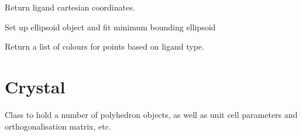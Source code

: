 \documentclass[a4paper,10pt,openany, oneside]{sphinxmanual}
\begin{document}
\begin{fulllineitems}
\begin{fulllineitems}
\label{api_reference:distellipsoid.polyhedron.Polyhedron.ligxyz}
Return ligand cartesian coordinates.

\end{fulllineitems}


\begin{fulllineitems}
\label{api_reference:distellipsoid.polyhedron.Polyhedron.makeellipsoid}
Set up ellipsoid object and fit minimum bounding ellipsoid

\end{fulllineitems}


\begin{fulllineitems}
\label{api_reference:distellipsoid.polyhedron.Polyhedron.pointcolours}
Return a list of colours for points based on ligand type.

\end{fulllineitems}


\end{fulllineitems}



\section{Crystal}
\label{api_reference:crystal}
Class to hold a number of polyhedron objects, as well as unit cell parameters and orthogonalisation matrix, etc.
\end{document}
